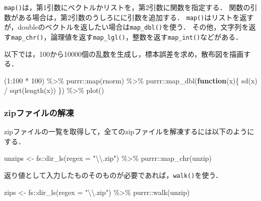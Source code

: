 \documentclass[
]{article}
\newenvironment{Shaded}{\begin{snugshade}}{\end{snugshade}}
\newcommand{\AttributeTok}[1]{\textcolor[rgb]{0.77,0.63,0.00}{#1}}
\newcommand{\ControlFlowTok}[1]{\textcolor[rgb]{0.13,0.29,0.53}{\textbf{#1}}}
\newcommand{\DecValTok}[1]{\textcolor[rgb]{0.00,0.00,0.81}{#1}}
\newcommand{\FunctionTok}[1]{\textcolor[rgb]{0.00,0.00,0.00}{#1}}
\newcommand{\NormalTok}[1]{#1}
\newcommand{\OtherTok}[1]{\textcolor[rgb]{0.56,0.35,0.01}{#1}}
\newcommand{\SpecialCharTok}[1]{\textcolor[rgb]{0.00,0.00,0.00}{#1}}
\newcommand{\StringTok}[1]{\textcolor[rgb]{0.31,0.60,0.02}{#1}}
\begin{document}
\texttt{map()}は，第1引数にベクトルかリストを，第2引数に関数を指定する．
関数の引数がある場合は，第2引数のうしろにに引数を追加する．
\texttt{map()}はリストを返すが，doubleのベクトルを返したい場合は\texttt{map\_dbl()}を使う．
その他，文字列を返す\texttt{map\_chr()}，論理値を返す\texttt{map\_lgl()}，整数を返す\texttt{map\_int()}などがある．

以下では，100から10000個の乱数を生成し，標本誤差を求め，散布図を描画する．

\begin{Shaded}
\begin{Highlighting}[]
\NormalTok{(}\DecValTok{1}\SpecialCharTok{:}\DecValTok{100} \SpecialCharTok{*} \DecValTok{100}\NormalTok{) }\SpecialCharTok{\%\textgreater{}\%}
\NormalTok{  purrr}\SpecialCharTok{::}\FunctionTok{map}\NormalTok{(rnorm) }\SpecialCharTok{\%\textgreater{}\%}
\NormalTok{  purrr}\SpecialCharTok{::}\FunctionTok{map\_dbl}\NormalTok{(}\ControlFlowTok{function}\NormalTok{(x)\{ }\FunctionTok{sd}\NormalTok{(x) }\SpecialCharTok{/} \FunctionTok{sqrt}\NormalTok{(}\FunctionTok{length}\NormalTok{(x)) \}) }\SpecialCharTok{\%\textgreater{}\%}
  \FunctionTok{plot}\NormalTok{()}
\end{Highlighting}
\end{Shaded}

\hypertarget{zipux30d5ux30a1ux30a4ux30ebux306eux89e3ux51cd}{%
\subsubsection{zipファイルの解凍}\label{zipux30d5ux30a1ux30a4ux30ebux306eux89e3ux51cd}}

zipファイルの一覧を取得して，全てのzipファイルを解凍するには以下のようにする．

\begin{Shaded}
\begin{Highlighting}[]
\NormalTok{unzips }\OtherTok{\textless{}{-}} 
\NormalTok{  fs}\SpecialCharTok{::}\FunctionTok{dir\_ls}\NormalTok{(}\AttributeTok{regex =} \StringTok{"}\SpecialCharTok{\textbackslash{}\textbackslash{}}\StringTok{.zip"}\NormalTok{) }\SpecialCharTok{\%\textgreater{}\%}
\NormalTok{  purrr}\SpecialCharTok{::}\FunctionTok{map\_chr}\NormalTok{(unzip)}
\end{Highlighting}
\end{Shaded}

返り値として入力したものそのものが必要であれば，\texttt{walk()}を使う．

\begin{Shaded}
\begin{Highlighting}[]
\NormalTok{zips }\OtherTok{\textless{}{-}} 
\NormalTok{  fs}\SpecialCharTok{::}\FunctionTok{dir\_ls}\NormalTok{(}\AttributeTok{regex =} \StringTok{"}\SpecialCharTok{\textbackslash{}\textbackslash{}}\StringTok{.zip"}\NormalTok{) }\SpecialCharTok{\%\textgreater{}\%}
\NormalTok{  purrr}\SpecialCharTok{::}\FunctionTok{walk}\NormalTok{(unzip)}
\end{Highlighting}
\end{Shaded}
\end{document}
